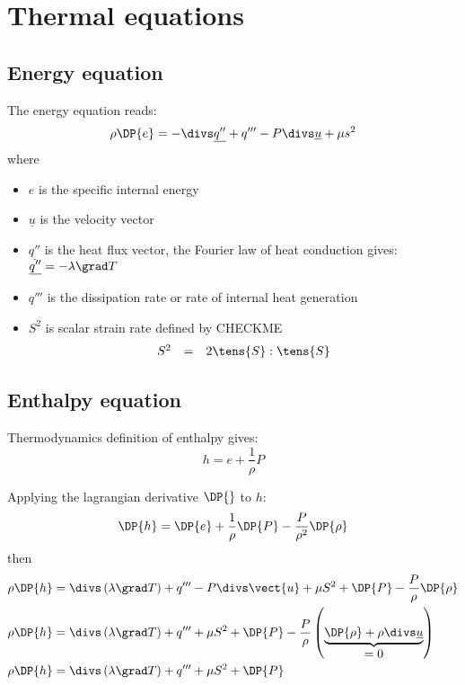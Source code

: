 \section{Thermal equations}

\subsection{Energy equation}
The energy equation reads:
\begin{equation}
 \rho \DP{e} = -\divs \underline{q''}+q'''-P\divs \underline{u} + \mu s^2 
\label{eq:energy}
\end{equation}
where 
\begin{itemize}
       \item $e$ is the specific internal energy
       \item $\underline{u}$ is the velocity vector
       \item $\underline{q''}$ is the heat flux vector, the Fourier law of heat conduction gives: $\displaystyle \underline{q''}=-\lambda \grad T$
       \item $q'''$ is the dissipation rate or rate of internal heat generation
       \item $S^2$ is scalar strain rate defined by CHECKME
	  \begin{equation}
	    \begin{array}{rcl}
	      S^2 & = & 2 \tens{S} : \tens{S}
	    \end{array}
	  \end{equation}
      \end{itemize}

\subsection{Enthalpy equation}

Thermodynamics definition of enthalpy gives:
\begin{equation}
 h=e+ \dfrac{1}{\rho} P
\end{equation}

Applying the lagrangian derivative $\DP{}$ to $h$:
\begin{equation}
 \DP{h}=\DP{e}+\frac{1}{\rho}\DP{P}-\frac{P}{\rho^2}\DP{\rho}
\end{equation}
%
then
\begin{align}
  \rho \DP{h} &= \divs \left( \lambda \grad T \right) +q'''-P\divs \vect{u} + \mu S^2 + \DP{P} -\frac{P}{\rho}\DP{\rho} \\
  \rho \DP{h} &= \divs \left( \lambda \grad T \right) +q''' + \mu  S^2 + \DP{P} - \frac{P}{\rho} \left(\underbrace{\DP{\rho} + \rho \divs \underline{u}}_{\displaystyle =0} \right) \\
  \rho \DP{h} &= \divs \left( \lambda \grad T \right) +q''' + \mu  S^2 + \DP{P} 
\label{eq:enthalpyT}
\end{align}


